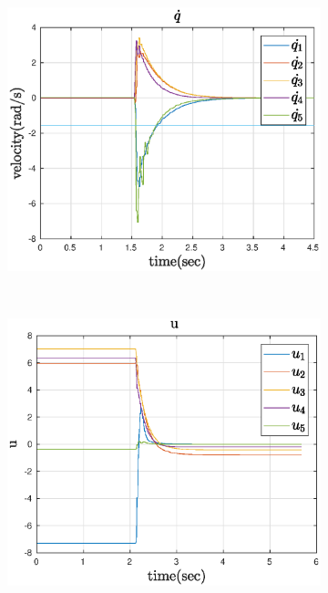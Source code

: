 \begin{figure}[htbp]
\begin{subfigure}[htbp]{0.45\textwidth}
        \caption{ }
    \end{subfigure}
    ~
    \centering
    \begin{subfigure}[htbp]{0.45\textwidth}
        \centering
        \includegraphics[width = \picsSiz\linewidth]{img/LSqdot.eps}
        \caption{ }
        \label{fig:LSqdot}
    \end{subfigure}
    ~ 
    \begin{subfigure}[htbp]{0.45\textwidth}
        \centering
        \includegraphics[width = \picsSiz\linewidth]{img/LSu.eps}

\end{subfigure}
\end{figure}
